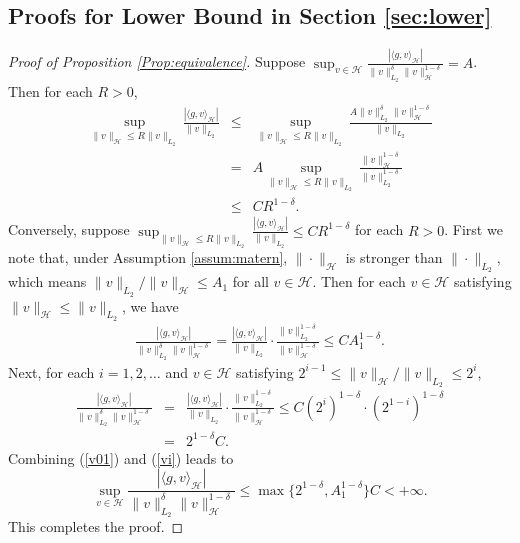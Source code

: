\documentclass[12pt]{article}
\theoremstyle{plain}
\theoremstyle{remark}
\begin{document}
\subsection{Proofs for Lower Bound in Section \ref{sec:lower}}
\begin{proof}[Proof of Proposition \ref{Prop:equivalence}]
    Suppose $\sup_{v\in\mathcal{H}}\frac{|\langle g,v\rangle_\mathcal{H}|}{\|v\|_{L_2}^\delta\|v\|^{1-\delta}_\mathcal{H}}= A$. Then for each $R>0$,
\begin{eqnarray*}
    \sup_{\|v\|_\mathcal{H}\leq R\|v\|_{L_2}}\frac{|\langle g,v\rangle_\mathcal{H}|}{\|v\|_{L_2}}&\leq& \sup_{\|v\|_\mathcal{H}\leq R\|v\|_{L_2}}\frac{A\|v\|_{L_2}^\delta\|v\|^{1-\delta}_\mathcal{H}}{\|v\|_{L_2}}\\
    &=& A \sup_{\|v\|_\mathcal{H}\leq R\|v\|_{L_2}}\frac{\|v\|^{1-\delta}_\mathcal{H}}{\|v\|_{L_2}^{1-\delta}}\\
    &\leq& CR^{1-\delta}.
\end{eqnarray*}
Conversely, suppose $\sup_{\|v\|_\mathcal{H}\leq R\|v\|_{L_2}}\frac{|\langle g,v\rangle_\mathcal{H}|}{\|v\|_{L_2}}\leq C R^{1-\delta}$ for each $R>0$. First we note that, under Assumption \ref{assum:matern}, $\|\cdot\|_\mathcal{H}$ is stronger than $\|\cdot\|_{L_2}$, which means $\|v\|_{L_2}/\|v\|_\mathcal{H}\leq A_1$ for all $v\in\mathcal{H}$.
Then for each $v\in\mathcal{H}$ satisfying $\|v\|_\mathcal{H}\leq \|v\|_{L_2}$, we have
\begin{eqnarray}\label{v01}
    \frac{|\langle g,v\rangle_\mathcal{H}|}{\|v\|_{L_2}^\delta\|v\|^{1-\delta}_\mathcal{H}}=\frac{|\langle g,v\rangle_\mathcal{H}|}{\|v\|_{L_2}}\cdot\frac{\|v\|_{L_2}^{1-\delta}}{\|v\|^{1-\delta}_\mathcal{H}}\leq C A_1^{1-\delta}.
\end{eqnarray}
Next, for each $i=1,2,\ldots$ and $v\in\mathcal{H}$ satisfying $2^{i-1}\leq \|v\|_\mathcal{H}/\|v\|_{L_2}\leq 2^i$,
\begin{eqnarray}\label{vi}
    \frac{|\langle g,v\rangle_\mathcal{H}|}{\|v\|_{L_2}^\delta\|v\|^{1-\delta}_\mathcal{H}}&=&\frac{|\langle g,v\rangle_\mathcal{H}|}{\|v\|_{L_2}}\cdot\frac{\|v\|_{L_2}^{1-\delta}}{\|v\|^{1-\delta}_\mathcal{H}}\leq C (2^i)^{1-\delta}\cdot (2^{1-i})^{1-\delta}\nonumber
    \\&=&2^{1-\delta}C.
\end{eqnarray}
Combining (\ref{v01}) and (\ref{vi}) leads to
\[\sup_{v\in\mathcal{H}}\frac{|\langle g,v\rangle_\mathcal{H}|}{\|v\|_{L_2}^\delta\|v\|^{1-\delta}_\mathcal{H}}\leq \max\{2^{1-\delta},A_1^{1-\delta}\}C<+\infty.\]
This completes the proof.
\end{proof}
\end{document}
